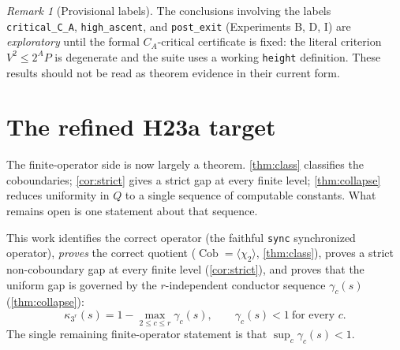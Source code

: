 \documentclass[11pt]{article}
\theoremstyle{plain}
\theoremstyle{definition}
\theoremstyle{remark}
\newtheorem*{remark}{Remark}
\begin{document}
\begin{remark}[Provisional labels]
The conclusions involving the labels \texttt{critical\_C\_A}, \texttt{high\_ascent},
and \texttt{post\_exit} (Experiments B, D, I) are \emph{exploratory} until the
formal $C_A$-critical certificate is fixed: the literal criterion $V^2\le2^A P$ is
degenerate and the suite uses a working \texttt{height} definition. These results
should not be read as theorem evidence in their current form.
\end{remark}

\part{The refined H23a target}
\label{sec:target}

The finite-operator side is now largely a theorem. \cref{thm:class} classifies
the coboundaries; \cref{cor:strict} gives a strict gap at every finite level;
\cref{thm:collapse} reduces uniformity in $Q$ to a single sequence of computable
constants. What remains open is one statement about that sequence.

\begin{keystatement}
This work identifies the correct operator (the faithful \texttt{sync}
synchronized operator), \emph{proves} the correct quotient
($\operatorname{Cob}=\langle\chi_2\rangle$, \cref{thm:class}), proves a strict
non-coboundary gap at every finite level (\cref{cor:strict}), and proves that the
uniform gap is governed by the $r$-independent conductor sequence
$\gamma_c(s)$ (\cref{thm:collapse}):
\[
\kappa_{3^r}(s)=1-\max_{2\le c\le r}\gamma_c(s),\qquad
\gamma_c(s)<1\ \text{for every }c .
\]
The single remaining finite-operator statement is that
$\sup_c\gamma_c(s)<1$.
\end{keystatement}
\end{document}
